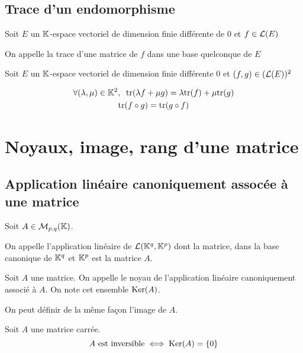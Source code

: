 \subsection{Trace d'un endomorphisme}

\begin{dfn}
Soit $E$ un $\mathbb{K}$-espace vectoriel de dimension finie différente de $0$
et $f \in \operatorname{\mathcal{L}}(E)$

On appelle  la trace d'une matrice de $f$ dans une base
quelconque de $E$
\end{dfn}

\begin{prp}
Soit $E$ un $\mathbb{K}$-espace vectoriel de dimension finie différente $0$ et
$(f, g) \in (\operatorname{\mathcal{L}}(E))^2$

\begin{gather*}
    \forall (\lambda, \mu) \in \mathbb{K}^2, \;\; \mathrm{tr}(\lambda f + \mu g) =
    \lambda \mathrm{tr}(f) + \mu \mathrm{tr}(g) \\
    \mathrm{tr}(f \circ g) = \mathrm{tr}(g \circ f)
\end{gather*}
\end{prp}


\section{Noyaux, image, rang d'une matrice}


\subsection{Application linéaire canoniquement assocée à une matrice}

\begin{dfn}
Soit $A \in \operatorname{\mathcal{M}}_{p, q}(\mathbb{K})$.

On appelle 
l'application linéaire de $\operatorname{\mathcal{L}}(\mathbb{K}^q, \mathbb{K}^p)$ dont la matrice, dans la
base canonique de $\mathbb{K}^q$ et $\mathbb{K}^p$ est la matrice $A$.
\end{dfn}

\begin{dfn}
Soit $A$ une matrice.
On appelle  le noyau de l'application linéaire
canoniquement associé à $A$. On note cet ensemble $\operatorname{Ker}(A)$.

On peut définir de la même façon l'image de $A$.
\end{dfn}

\begin{prp}
Soit $A$ une matrice carrée.
\[
    A \text{ est inversible} \iff \operatorname{Ker}(A) = \{0\}
\]
\end{prp}

